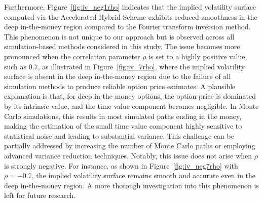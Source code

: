 \documentclass[11pt]{article}%
\theoremstyle{definition}
\begin{document}
Furthermore, Figure~\ref{fig:iv_neg1rho} indicates that the implied volatility surface computed via the Accelerated Hybrid Scheme exhibits reduced smoothness in the deep in-the-money region compared to the Fourier transform inversion method. This phenomenon is not unique to our approach but is observed across all simulation-based methods considered in this study. The issue becomes more pronounced when the correlation parameter \(\rho\) is set to a highly positive value, such as 0.7, as illustrated in Figure~\ref{fig:iv_7rho}, where the implied volatility surface is absent in the deep in-the-money region due to the failure of all simulation methods to produce reliable option price estimates. A plausible explanation is that, for deep in-the-money options, the option price is dominated by its intrinsic value, and the time value component becomes negligible. In Monte Carlo simulations, this results in most simulated paths ending in the money, making the estimation of the small time value component highly sensitive to statistical noise and leading to substantial variance. This challenge can be partially addressed by increasing the number of Monte Carlo paths or employing advanced variance reduction techniques. Notably, this issue does not arise when \(\rho\) is strongly negative. For instance, as shown in Figure~\ref{fig:iv_neg7rho} with \(\rho = -0.7\), the implied volatility surface remains smooth and accurate even in the deep in-the-money region. A more thorough investigation into this phenomenon is left for future research. 
\end{document}
